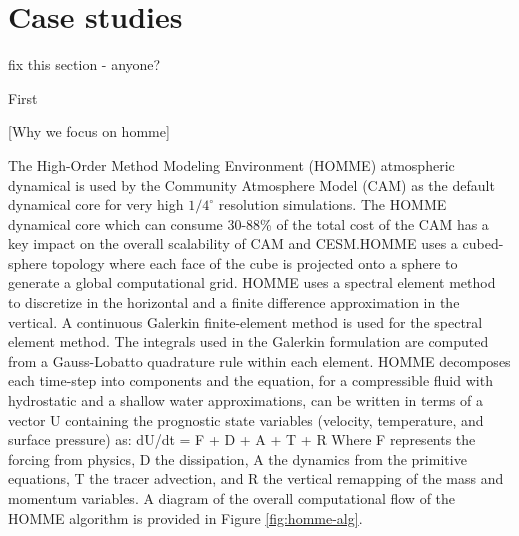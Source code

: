 
\section{Case studies}\label{sec:algorithm}
 {\color{red} fix this section - anyone?}

First


[Why we focus on homme]


The High-Order Method Modeling Environment (HOMME) atmospheric dynamical is used by the Community Atmosphere Model (CAM) as the default dynamical core for very high $1/4^\circ$ resolution simulations.   The HOMME dynamical core which can consume 30-88\% of the total cost of the CAM has a key impact on the overall scalability of CAM and CESM.HOMME uses a cubed-sphere topology where each face of the cube is projected onto a sphere to generate a global computational grid.  HOMME uses a spectral element method to discretize in the horizontal and a finite difference approximation \cite{simmons:1981} in the vertical. A continuous Galerkin finite-element method \cite{taylor:1997} is used for the spectral element method. The integrals used in the Galerkin formulation are computed from a Gauss-Lobatto quadrature rule within each element.  HOMME decomposes each time-step into components and the equation, for a compressible fluid with hydrostatic and a shallow water approximations, can be written in terms of a vector U containing the prognostic state variables (velocity, temperature, and surface pressure) as: 
dU/dt = F + D + A + T + R
Where F represents the forcing from physics, D the dissipation, A the dynamics from the primitive equations, T the tracer advection, and R the vertical remapping of the mass and momentum variables. A diagram of the overall computational flow of the HOMME algorithm is provided in Figure \ref{fig:homme-alg}. 

